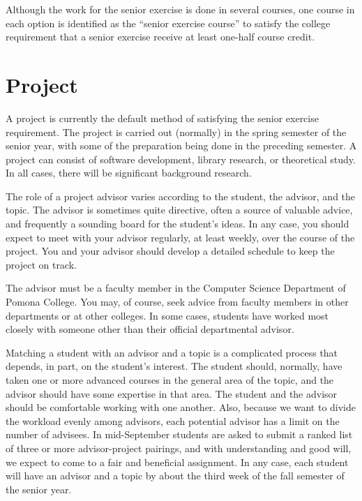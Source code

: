 \documentclass[finalcopy]{srpaper}
\begin{document}
Although the work for the senior exercise is done in several
courses, one course in each option is identified as the
``senior exercise course'' to satisfy the college
requirement that a senior exercise receive at least one-half
course credit.


\section{Project}
A project is currently the default method of satisfying the
senior exercise requirement. The project is carried out
(normally) in the spring semester of the senior year, with
some of the preparation being done in the preceding
semester. A project can consist of software development,
library research, or theoretical study. In all cases, there
will be significant background research.

The role of a project advisor
varies according to the
student, the advisor, and the topic. The advisor is
sometimes quite directive, often a source of
valuable advice, and frequently a sounding
board for the student's ideas. In any case, you should
expect to meet with your advisor regularly, at least weekly,
over the course of the project. You and your advisor should
develop a detailed schedule to keep the
project on track.

The advisor
must be a faculty member in the Computer Science
Department of Pomona College. You may, of course, seek
advice from faculty members in other departments or at other
colleges. In some cases, students have worked most closely
with someone other than their official departmental advisor.

Matching a student with an advisor and a topic is a
complicated process that depends, in part, on the student's
interest. The student should, normally, have taken one or
more advanced courses in the general area of the topic, and
the advisor should have some expertise in that area. The
student and the advisor should be comfortable working with
one another. Also, because we want to divide the workload
evenly among advisors, each potential advisor has a limit on
the number of advisees. In mid-September students are
asked to submit a ranked list of three or more 
advisor-project pairings, and with understanding and good
will, we expect to come to a fair
and beneficial assignment. In any case, each student will
have an advisor 
and a topic by about the third week of the
fall semester of the senior year.
\end{document}
